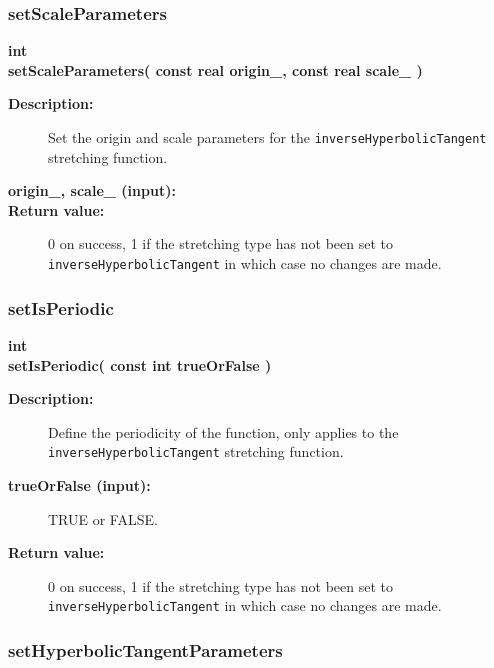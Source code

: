 \subsubsection{setScaleParameters}
 
\begin{flushleft} \textbf{%
int  \\ 
\settowidth{\StretchMappingIncludeArgIndent}{setScaleParameters(}%
setScaleParameters( const real origin\_, const real scale\_ )
}\end{flushleft}
\begin{description}
\item[{\bf Description:}]  
    Set the origin and scale parameters for the {\tt inverseHyperbolicTangent} stretching
   function.
\item[{\bf origin\_, scale\_ (input):}] 
\item[{\bf Return value:}]  0 on success, 1 if the stretching type has not been set to {\tt inverseHyperbolicTangent}
   in which case no changes are made.  
\end{description}
\subsubsection{setIsPeriodic}
 
\begin{flushleft} \textbf{%
int  \\ 
\settowidth{\StretchMappingIncludeArgIndent}{setIsPeriodic(}%
setIsPeriodic( const int trueOrFalse )
}\end{flushleft}
\begin{description}
\item[{\bf Description:}]  
   Define the periodicity of the function, only applies to the {\tt inverseHyperbolicTangent} stretching
   function.
\item[{\bf trueOrFalse (input):}]  TRUE or FALSE.
\item[{\bf Return value:}]  0 on success, 1 if the stretching type has not been set to {\tt inverseHyperbolicTangent}
   in which case no changes are made.  
\end{description}
\subsubsection{setHyperbolicTangentParameters}
 
